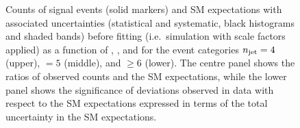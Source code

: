 \begin{figure}
\begin{center}
  \caption{Counts of signal events (solid markers) and SM expectations
    with associated uncertainties (statistical and systematic, black
    histograms and shaded bands) 
    before fitting (i.e.\ simulation with scale factors applied)
    as a function of \nb, \scalht, and \mht for the event categories
    $n_{\text{jet}} = 4$ (upper), $=5$ (middle), and ${\geq}6$ (lower).
    The centre panel shows the ratios of
    observed counts and the SM expectations, while the lower panel
    shows the significance of deviations observed in data with respect
    to the SM expectations expressed in terms of the total uncertainty
    in the SM expectations.
    }
        \label{fig:T1qqqqLL_no-fit_456}
    \end{center}
\end{figure}

